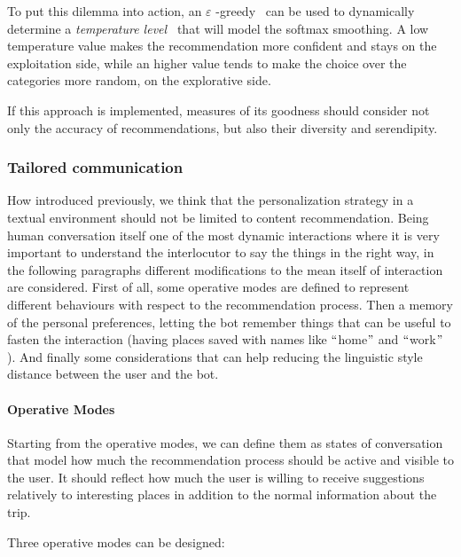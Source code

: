 To put this dilemma into action, an $ \varepsilon $ -greedy~\cite{tokic2010adaptive} can be used to dynamically determine a \textit{temperature level~\cite{hinton2015distilling}} that will model the softmax smoothing. A low temperature value makes the recommendation more confident and stays on the exploitation side, while an higher value tends to make the choice over the categories more random, on the explorative side.

If this approach is implemented, measures of its goodness should consider not only the accuracy of recommendations, but also their diversity and serendipity.

\subsubsection{Tailored communication}
\label{approachPersonalizationCommunication}

How introduced previously, we think that the personalization strategy in a textual environment should not be limited to content recommendation. Being human conversation itself one of the most dynamic interactions where it is very important to understand the interlocutor to say the things in the right way, in the following paragraphs different modifications to the mean itself of interaction are considered. First of all, some operative modes are defined to represent different behaviours with respect to the recommendation process. Then a memory of the personal preferences, letting the bot remember things that can be useful to fasten the interaction (having places saved with names like $``$home$"$  and $``$work$"$ ). And finally some considerations that can help reducing the linguistic style distance between the user and the bot.

\paragraph{Operative Modes}
Starting from the operative modes, we can define them as states of conversation that model how much the recommendation process should be active and visible to the user. It should reflect how much the user is willing to receive suggestions relatively to interesting places in addition to the normal information about the trip.

Three operative modes can be designed:

